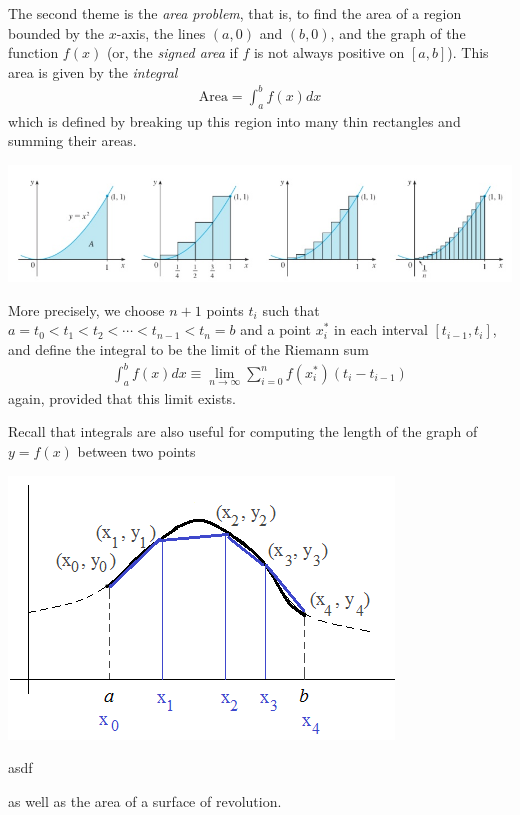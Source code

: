 \documentclass[12pt,letterpaper,reqno]{article}
\numberwithin{equation}{section}
\newcommand{\ti}[1]{\textit{#1}}
\begin{document}
The second theme is the \ti{area problem}, that is, to find the area of a region bounded by the $x$-axis, the lines $(a,0)$ and $(b,0)$, and the graph of the function $f(x)$ (or, the \ti{signed area} if $f$ is not always positive on $[a,b]$). This area is given by the \ti{integral}
\begin{align*}
	\text{Area}=\int_a^b f(x)dx
\end{align*}
which is defined by breaking up this region into many thin rectangles and summing their areas. 
\begin{center}
	\includegraphics[scale=0.5]{figures_mvc/riemann_sum_example}
\end{center}
More precisely, we choose $n+1$ points $t_i$ such that $a=t_0<t_1<t_2<\cdots <t_{n-1}<t_n=b$ and a point $x_i^*$ in each interval $[t_{i-1},t_i]$, and define the integral to be the limit of the Riemann sum
\begin{align*}
	\int_a^b f(x)dx\equiv \lim_{n\to \infty} \sum_{i=0}^nf(x_i^*)(t_i-t_{i-1})
\end{align*}
again, provided that this limit exists. 

Recall that integrals are also useful for computing the length of the graph of $y=f(x)$ between two points 

\begin{center}
	\includegraphics[scale=0.5]{figures_mvc/arc_length}
\end{center}asdf 

as well as the area of a surface of revolution.
\end{document}
